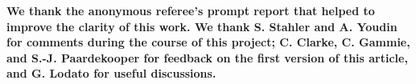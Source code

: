 \documentclass[iop, numberedappendix]{emulateapj}
\begin{document}




 



{\bf
We thank the anonymous referee's prompt report that helped to improve
the clarity of this work. We thank S. Stahler and A. Youdin for
comments during the  course of this project; C. Clarke,
C. Gammie, and S.-J. Paardekooper for feedback on the first version of
this article, and G. Lodato for useful discussions.  
}

\appendix




\end{document}
